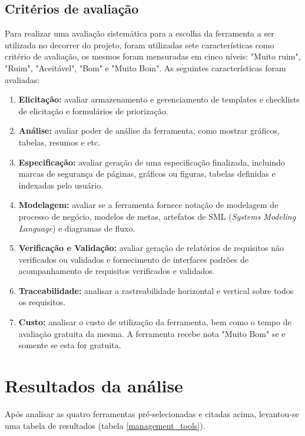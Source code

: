 \subsection{Critérios de avaliação}
Para realizar uma avaliação sistemática para a escolha da ferramenta a ser utilizada no decorrer do projeto, foram utilizadas sete características como critério de avaliação, os mesmos foram mensuradas em cinco níveis: "Muito ruim", "Ruim", "Aceitável", "Bom" e "Muito Bom". As seguintes características foram avaliadas:
\begin{enumerate}
	\item \textbf{Elicitação:} avaliar armazenamento e gerenciamento de templates e checklists de elicitação e formulários de priorização.
	\item \textbf{Análise:} avaliar poder de análise da ferramenta, como mostrar gráficos, tabelas, resumos e etc.
	\item \textbf{Especificação:} avaliar geração de uma especificação finalizada, incluindo marcas de segurança de páginas, gráficos ou figuras, tabelas definidas e indexadas pelo usuário.
	\item \textbf{Modelagem:} avaliar se a ferramenta fornece notação de modelagem de processo de negócio, modelos de metas, artefatos de SML (\textit{Systems Modeling Language}) e diagramas de fluxo.
	\item \textbf{Verificação e Validação:} avaliar geração de relatórios de requisitos não verificados ou validados e fornecimento de interfaces padrões de acompanhamento de requisitos verificados e validados.
	\item \textbf{Traceabilidade:} analisar a rastreabilidade horizontal e vertical sobre todos os requisitos.
	\item \textbf{Custo:} analisar o custo de utilização da ferramenta, bem como o tempo de avaliação gratuita da mesma. A ferramenta recebe nota "Muito Bom" se e somente se esta for gratuita.
\end{enumerate}

\section{Resultados da análise}

Após analisar as quatro ferramentas pré-selecionadas e citadas acima, levantou-se uma tabela de resultados (tabela \ref{management_tools}).

